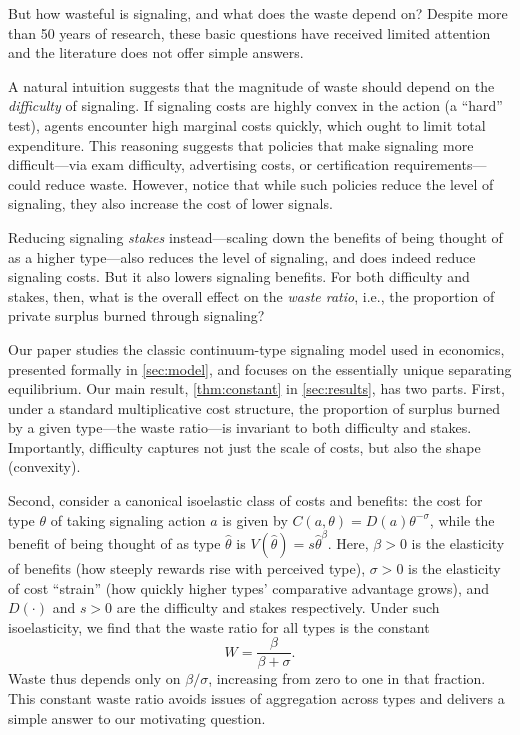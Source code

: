 \documentclass[12 pt]{article}
\theoremstyle{remark}
\theoremstyle{definition}
\begin{document}
But how wasteful is signaling, and what does the %
waste
depend on? %
Despite more than 50 years of research, these basic questions have received limited attention and the literature does not offer simple answers.

A natural intuition suggests that the magnitude of waste should depend on the \emph{difficulty} of signaling. If signaling costs are highly convex in the action (a ``hard'' test), agents encounter high marginal costs quickly, which ought to limit total expenditure. This reasoning suggests that policies that make signaling more difficult---via exam difficulty, advertising costs, or certification requirements---could reduce waste. However, notice that while such policies reduce the level of signaling, they also increase the cost of lower signals.

Reducing signaling \emph{stakes} instead---scaling down the benefits of being thought of as a higher type---also reduces the level of signaling, and does indeed reduce signaling costs. But it also lowers signaling benefits. For both difficulty and stakes, then, what is the overall effect on the \emph{waste ratio}, i.e., the proportion of private surplus burned through signaling?

Our paper studies the classic continuum-type signaling model used in economics, presented formally in \autoref{sec:model}, and focuses on the essentially unique separating equilibrium. Our main result, \autoref{thm:constant} in \autoref{sec:results}, has two parts. First, under a standard multiplicative cost structure, the proportion of surplus burned by a given type---the waste ratio---is invariant to both difficulty and stakes. Importantly, difficulty captures not just the scale of costs, but also the shape (convexity).


Second, consider a canonical isoelastic class of costs and benefits: the cost for type $\theta$ of taking signaling action $a$ is given by $C(a,\theta)=D(a) \theta^{-\sigma}$, while the benefit of being thought of as type $\hat \theta$ is $V(\hat \theta) = s \hat \theta^\beta$. Here, $\beta>0$ is the elasticity of benefits (how steeply rewards rise with perceived type),  $\sigma>0$ is the elasticity of cost ``strain'' (how quickly higher types' comparative advantage grows), and $D(\cdot)$ and $s>0$ are the difficulty and stakes respectively. Under such isoelasticity, we find that the waste ratio for all types is the constant 
\[
W = \frac{\beta}{\beta + \sigma}.
\]
Waste thus depends only on $\beta/\sigma$, increasing from zero to one in that fraction. This constant waste ratio avoids issues of aggregation across types and delivers a simple answer to our motivating question. 
\end{document}
